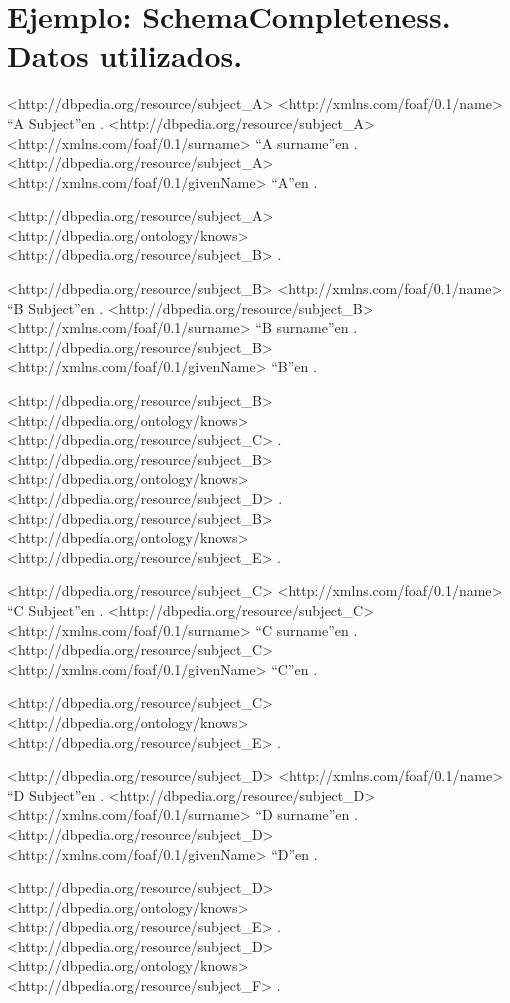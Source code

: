 \chapter{Ejemplo: SchemaCompleteness. Datos utilizados.}
\label{ex:sc}

\begin{listing}[
  language = XML,
  numbers=left,
  numberstyle=\tiny,
  stepnumber=5,
  numbersep=5pt,
  frame=single,
  caption  = {Datos utilizados para el ejemplo SchemaCompleteness},
  label    = ex:scdata]
<http://dbpedia.org/resource/subject_A> <http://xmlns.com/foaf/0.1/name> ``A Subject''en .
<http://dbpedia.org/resource/subject_A> <http://xmlns.com/foaf/0.1/surname> ``A surname''en .
<http://dbpedia.org/resource/subject_A> <http://xmlns.com/foaf/0.1/givenName> ``A''en .

<http://dbpedia.org/resource/subject_A> <http://dbpedia.org/ontology/knows> <http://dbpedia.org/resource/subject_B> .

<http://dbpedia.org/resource/subject_B> <http://xmlns.com/foaf/0.1/name> ``B Subject''en .
<http://dbpedia.org/resource/subject_B> <http://xmlns.com/foaf/0.1/surname> ``B surname''en .
<http://dbpedia.org/resource/subject_B> <http://xmlns.com/foaf/0.1/givenName> ``B''en .

<http://dbpedia.org/resource/subject_B> <http://dbpedia.org/ontology/knows> <http://dbpedia.org/resource/subject_C> .
<http://dbpedia.org/resource/subject_B> <http://dbpedia.org/ontology/knows> <http://dbpedia.org/resource/subject_D> .
<http://dbpedia.org/resource/subject_B> <http://dbpedia.org/ontology/knows> <http://dbpedia.org/resource/subject_E> .

<http://dbpedia.org/resource/subject_C> <http://xmlns.com/foaf/0.1/name> ``C Subject''en .
<http://dbpedia.org/resource/subject_C> <http://xmlns.com/foaf/0.1/surname> ``C surname''en .
<http://dbpedia.org/resource/subject_C> <http://xmlns.com/foaf/0.1/givenName> ``C''en .

<http://dbpedia.org/resource/subject_C> <http://dbpedia.org/ontology/knows> <http://dbpedia.org/resource/subject_E> .

<http://dbpedia.org/resource/subject_D> <http://xmlns.com/foaf/0.1/name> ``D Subject''en .
<http://dbpedia.org/resource/subject_D> <http://xmlns.com/foaf/0.1/surname> ``D surname''en .
<http://dbpedia.org/resource/subject_D> <http://xmlns.com/foaf/0.1/givenName> ``D''en .

<http://dbpedia.org/resource/subject_D> <http://dbpedia.org/ontology/knows> <http://dbpedia.org/resource/subject_E> .
<http://dbpedia.org/resource/subject_D> <http://dbpedia.org/ontology/knows> <http://dbpedia.org/resource/subject_F> .


\end{listing}

